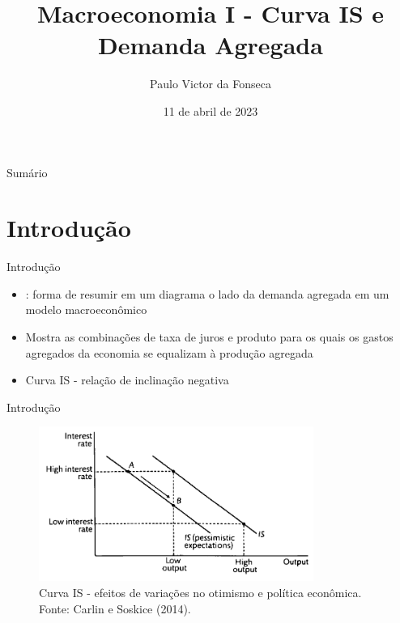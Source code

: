 \documentclass[10pt]{beamer}
\title[]{Macroeconomia I - Curva IS e Demanda Agregada}
\author[]{Paulo Victor da Fonseca}
\date{11 de abril de 2023}
\begin{document}
\begin{frame}[plain]
\end{frame}

\begin{frame}{Sumário}
    \tableofcontents
\end{frame}

\section{Introdução}
\begin{frame}{Introdução}
    \begin{itemize}
        \item {}: forma de resumir em um diagrama o lado da demanda agregada em um modelo macroeconômico\bigskip

        \item Mostra as combinações de taxa de juros e produto para os quais os gastos agregados da economia se equalizam à produção agregada\bigskip

        \item Curva IS - relação de inclinação negativa
    \end{itemize}
\end{frame}

\begin{frame}{Introdução}    
    \begin{figure}
        \centering
        \includegraphics[width=0.8\textwidth]{./figures/aula6_fig1.PNG}
        \caption{Curva IS - efeitos de variações no otimismo e política econômica. Fonte: Carlin e Soskice (2014).}
        \label{aula6_fig1}
    \end{figure}
\end{frame}
\end{document}
